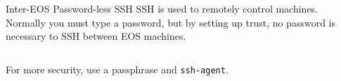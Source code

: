 \begin{block}{Inter-EOS Password-less SSH}
  SSH is used to remotely control machines. Normally you must type a password, but by setting up trust, no password is necessary to SSH between EOS machines.
  \begin{indented}
    {\scriptsize \inputminted[tabsize=2,frame=single]{bash}{scripts/ssh.bash}}
  \end{indented}
  For more security, use a passphrase and \texttt{ssh-agent}.
\end{block}
